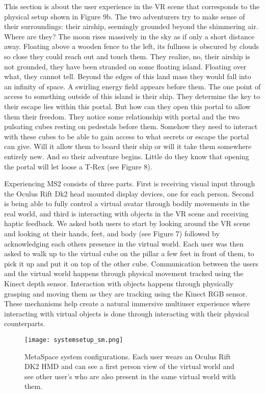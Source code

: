 \documentclass{sigchi}
\begin{document}
This section is about the user experience in the VR scene that corresponds to the physical setup shown in Figure 9b. The two adventurers try to make sense of their surroundings: their airship, seemingly grounded beyond the shimmering air. Where are they? The moon rises massively in the sky as if only a short distance away. Floating above a wooden fence to the left, its fullness is obscured by clouds so close they could reach out and touch them. They realize, no, their airship is not grounded, they have been stranded on some floating island. Floating over what, they cannot tell. Beyond the edges of this land mass they would fall into an infinity of space.  A swirling energy field appears before them. The one point of access to something outside of this island is their ship. They determine the key to their escape lies within this portal. But how can they open this portal to allow them their freedom. They notice some relationship with portal and the two pulsating cubes resting on pedestals before them. Somehow they need to interact with these cubes to be able to gain access to what secrets or escape the portal can give. Will it allow them to board their ship or will it take them somewhere entirely new. And so their adventure begins. Little do they know that opening the portal will let loose a T-Rex (see Figure 8). 


Experiencing MS2 consists of three parts. First is receiving visual input through the Oculus Rift Dk2 head mounted display devices, one for each person. Second is being able to fully control a virtual avatar through bodily movements in the real world, and third is interacting with objects in the VR scene and receiving haptic feedback. We asked both users to start by looking around the VR scene and looking at their hands, feet, and body (see Figure 7) followed by acknowledging each others presence in the virtual world. Each user was then asked to walk up to the virtual cube on the pillar a few feet in front of them, to pick it up and put it on top of the other cube. Communication between the users and the virtual world happens through physical movement tracked using the Kinect depth sensor. Interaction with objects happens through physically grasping and moving them as they are tracking using the Kinect RGB sensor. These mechanisms help create a natural immersive multiuser experience where interacting with virtual objects is done through interacting with their physical counterparts. 


\begin{figure}[!t]
\centering
\texttt{[image: systemsetup\_sm.png]}
\caption{MetaSpace system configurations. Each user wears an Oculus Rift DK2 HMD and can see a first person view of the virtual world and see other user's who are also present in the same virtual world with them.  }
\label{fig:setup}
\end{figure}
\end{document}
